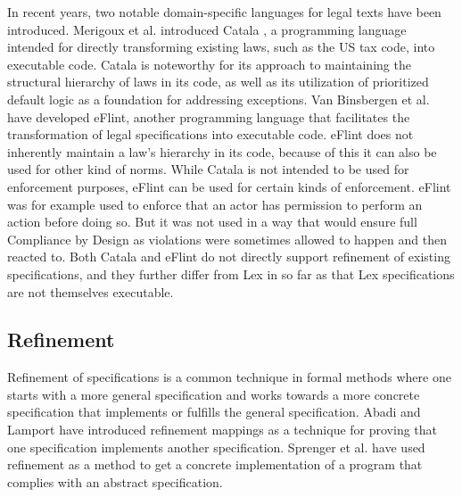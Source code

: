 In recent years, two notable domain-specific languages
for legal texts have been introduced.
Merigoux et al. introduced Catala \cite{merigoux_catala_2021},
a programming language intended for directly transforming
existing laws, such as the US tax code, into executable code.
Catala is noteworthy for its approach to
maintaining the structural hierarchy of laws in
its code, as well as its utilization of prioritized default logic
\cite{brewka2000prioritizing}
as a foundation for addressing exceptions.
Van Binsbergen et al. \cite{van2020eflint}
have developed eFlint, another programming language
that facilitates the transformation of
legal specifications into executable code.
eFlint does not inherently maintain a law's hierarchy in
its code, because of this it can also be used for
other kind of norms.
While Catala is not intended to be used for enforcement
purposes, eFlint can be used for certain kinds of
enforcement.
eFlint was for example used to enforce that an
actor has permission to perform an action before doing so.
But it was not used in a way that would ensure full
Compliance by Design as violations were sometimes allowed
to happen and then reacted to.
Both Catala and eFlint do not directly support
refinement of existing specifications, and they further
differ from Lex in so far as that Lex specifications are
not themselves executable.

\subsection{Refinement}
Refinement of specifications is a common technique in formal
methods where one starts with a more general specification
and works towards a more concrete specification that
implements or fulfills the general specification.
Abadi and Lamport \cite{refinement-mappings} have introduced
refinement mappings as a technique for proving that
one specification implements another specification.
Sprenger et al. \cite{igloo} have used refinement as a
method to get a concrete implementation of a program
that complies with an abstract specification.



